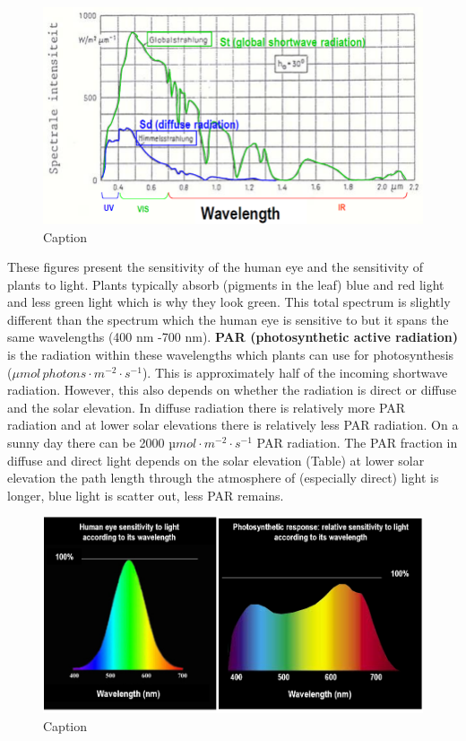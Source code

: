 \documentclass[oneside]{book}
\begin{document}
\begin{figure}

{\centering \includegraphics[width=0.9\linewidth]{figures/Figure128} 

}

\caption{Caption}\label{fig:Diffuse2}
\end{figure}

These figures present the sensitivity of the human eye and the
sensitivity of plants to light. Plants typically absorb (pigments in the
leaf) blue and red light and less green light which is why they look
green. This total spectrum is slightly different than the spectrum which
the human eye is sensitive to but it spans the same wavelengths (400 nm
-700 nm). \textbf{PAR (photosynthetic active radiation)} is the
radiation within these wavelengths which plants can use for
photosynthesis (\(\mu mol \, photons \cdot m^{-2} \cdot s^{-1}\)). This
is approximately half of the incoming shortwave radiation. However, this
also depends on whether the radiation is direct or diffuse and the solar
elevation. In diffuse radiation there is relatively more PAR radiation
and at lower solar elevations there is relatively less PAR radiation. On
a sunny day there can be 2000 \(µmol \cdot m^{-2} \cdot s^{-1}\) PAR
radiation. The PAR fraction in diffuse and direct light depends on the
solar elevation (Table) at lower solar elevation the path length through
the atmosphere of (especially direct) light is longer, blue light is
scatter out, less PAR remains.

\begin{figure}

{\centering \includegraphics[width=0.8\linewidth]{figures/Figure129} 

}

\caption{Caption}\label{fig:PAR}
\end{figure}
\end{document}
